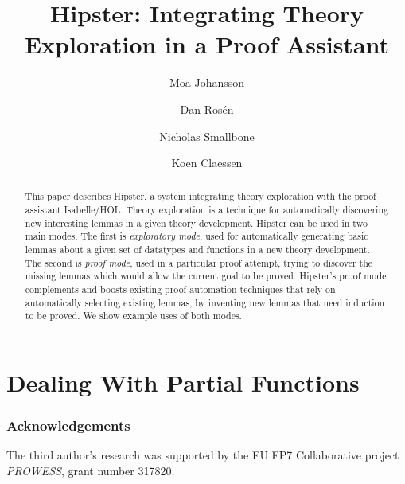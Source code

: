 \documentclass{llncs}
\begin{document}
\title{Hipster: Integrating Theory Exploration in a Proof Assistant}

\author{Moa Johansson \and Dan Ros\'en \and Nicholas Smallbone \and Koen Claessen}


\maketitle

\begin{abstract}

This paper describes Hipster, a system integrating theory exploration with the proof assistant Isabelle/HOL. Theory exploration is a technique for automatically discovering new interesting lemmas in a given theory development.
Hipster can be used in two main modes. The first is {\em exploratory mode}, used for automatically generating basic lemmas about a given set of datatypes and functions in a new theory development. The second is {\em proof mode}, used in a particular proof attempt, trying to discover the missing lemmas which would allow the current goal to be proved. Hipster's proof mode complements and boosts existing proof automation techniques that rely on automatically selecting existing lemmas, by inventing new lemmas that need induction to be proved. We show example uses of both modes.
\end{abstract}








\section{Dealing With Partial Functions}
\label{sec:partial}







\subsubsection*{Acknowledgements} The third author's research was
supported by the EU FP7 Collaborative project {\em PROWESS}, grant
number 317820.



\end{document}
